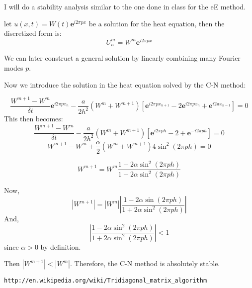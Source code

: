 \documentclass[10pt]{article}
\def\dt{\delta t}
\def\exp#1{\mathbf{e}^{#1}}
\begin{document}
I will do a stability analysis similar to the one done in class for the eE method.

let $u(x,t) = W(t) \exp{i2\pi p x}$ be a solution for the heat equation, then the discretized form is:
\[
U_{n}^{m} = W^m \exp{i2 \pi px}
\]

We can later construct a general solution by linearly combining many Fourier modes $p$.

Now we introduce the solution in the heat equation solved by the C-N method:


\[
\frac{W^{m+1}-W^m}{\dt}\exp{i2\pi px_n} -\frac{a}{2h^2}\left(W^m+W^{m+1}\right)\left[\exp{i2\pi p x_{n+1}}-2\exp{i2\pi p x_n} + \exp{i2\pi x_{n-1}}\right] = 0
\]
This then becomes:
\[
\frac{W^{m+1}-W^m}{\dt} -\frac{a}{2h^2}\left(W^m+W^{m+1}\right)\left[\exp{i2\pi p h}-2+ \exp{-i2\pi p h}\right] = 0
\]
\[
W^{m+1}-W^m +\frac{\alpha}{2}\left(W^m+W^{m+1}\right)4\sin^2(2\pi p h) = 0
\]


\[
W^{m+1} = W^m \frac{1 -2\alpha\sin^2(2\pi p h)}{ 1 +2\alpha\sin^2(2\pi p h)}
\] 

Now,
\[
|W^{m+1}| = |W^m |\left|\frac{1 -2\alpha\sin(2\pi p h)}{ 1 +2\alpha\sin^2(2\pi p h)}\right| 
\] 
And,
\[
\left|\frac{1 -2\alpha\sin^2(2\pi p h)}{ 1 +2\alpha\sin^2(2\pi p h)}\right| <1
\]
since $\alpha >0$ by definition.

Then $|W^{m+1}|<|W^m |$. Therefore, the C-N method is absolutely stable.


\begin{thebibliography}{9}

  \begin{verbatim}http://en.wikipedia.org/wiki/Tridiagonal_matrix_algorithm\end{verbatim}
\end{thebibliography}
\end{document}
